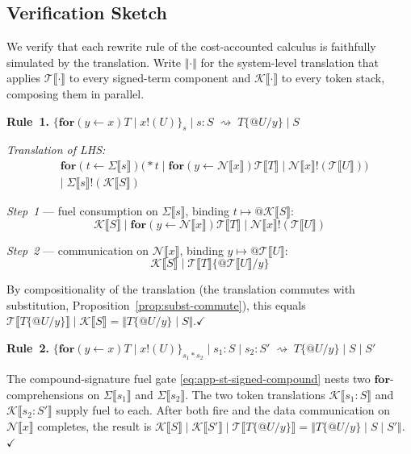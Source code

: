 \documentclass[11pt,a4paper]{article}
\makeatletter
\newcommand{\lsem}{\llbracket}
\newcommand{\rsem}{\rrbracket}
\newcommand{\Par}{\mathbin{|}}
\newcommand{\forc}{\mathbf{for}}
\newcommand{\send}[2]{#1 !\!\left( #2 \right)}
\newcommand{\recv}[3]{\forc\!\left( #1 \leftarrow #2 \right) #3}
\newcommand{\drop}[1]{{\ast} #1}
\newcommand{\quot}[1]{@#1}
\newcommand{\subst}[3]{#1\{#2 / #3\}}
\newcommand{\signed}[2]{\{#1\}_{#2}}
\newcommand{\comp}{\mathbin{*}}
\newcommand{\red}{\rightsquigarrow}
\makeatother
\begin{document}
\subsection{Verification Sketch}
\label{app:verification}

We verify that each rewrite rule of the cost-accounted
calculus is faithfully simulated by the translation.  Write
$\Vert\cdot\Vert$ for the system-level translation that
applies $\mathcal{T}\lsem\cdot\rsem$ to every signed-term
component and $\mathcal{K}\lsem\cdot\rsem$ to every token
stack, composing them in parallel.

\bigskip
\noindent
\textbf{Rule~1.}\;
$\signed{\recv{y}{x}{T} \Par \send{x}{U}}{s} \Par s : S
\;\red\; \subst{T}{\quot{U}}{y} \Par S$

\medskip\noindent
\textit{Translation of LHS:}
\begin{align*}
  &\recv{t}{\Sigma\lsem s \rsem}{
    \bigl(
      \drop{t}
      \Par \recv{y}{\mathcal{N}\lsem x \rsem}{
        \mathcal{T}\lsem T \rsem
      }
      \Par \send{\mathcal{N}\lsem x \rsem}{
        \mathcal{T}\lsem U \rsem
      }
    \bigr)
  }
  \\
  &\Par\;
  \send{\Sigma\lsem s \rsem}{\mathcal{K}\lsem S \rsem}
\end{align*}

\noindent
\textit{Step~1} --- fuel consumption on
$\Sigma\lsem s \rsem$, binding
$t \mapsto \quot{\mathcal{K}\lsem S \rsem}$:
\[
  \mathcal{K}\lsem S \rsem
  \Par
  \recv{y}{\mathcal{N}\lsem x \rsem}{
    \mathcal{T}\lsem T \rsem
  }
  \Par
  \send{\mathcal{N}\lsem x \rsem}{
    \mathcal{T}\lsem U \rsem
  }
\]

\noindent
\textit{Step~2} --- communication on
$\mathcal{N}\lsem x \rsem$, binding
$y \mapsto \quot{\mathcal{T}\lsem U \rsem}$:
\[
  \mathcal{K}\lsem S \rsem
  \Par
  \mathcal{T}\lsem T \rsem
    \bigl\{\quot{\mathcal{T}\lsem U \rsem}\big/y\bigr\}
\]

\noindent
By compositionality of the translation (the translation
commutes with substitution, Proposition~\ref{prop:subst-commute}),
this equals
$\mathcal{T}\lsem \subst{T}{\quot{U}}{y} \rsem \Par
\mathcal{K}\lsem S \rsem = \Vert \subst{T}{\quot{U}}{y} \Par S
\Vert$.\quad$\checkmark$

\bigskip
\noindent
\textbf{Rule~2.}\;
$\signed{\recv{y}{x}{T} \Par \send{x}{U}}{s_1 \comp s_2}
\Par s_1 : S \Par s_2 : S'
\;\red\; \subst{T}{\quot{U}}{y} \Par S \Par S'$

\medskip\noindent
The compound-signature fuel gate
\eqref{eq:app-st-signed-compound} nests two
$\mathbf{for}$-comprehensions on $\Sigma\lsem s_1 \rsem$ and
$\Sigma\lsem s_2 \rsem$.  The two token translations
$\mathcal{K}\lsem s_1 : S \rsem$ and
$\mathcal{K}\lsem s_2 : S' \rsem$ supply fuel to each.
After both fire and the data communication on
$\mathcal{N}\lsem x \rsem$ completes, the result is
$\mathcal{K}\lsem S \rsem \Par \mathcal{K}\lsem S' \rsem \Par
\mathcal{T}\lsem \subst{T}{\quot{U}}{y} \rsem
= \Vert \subst{T}{\quot{U}}{y} \Par S \Par S' \Vert$.
\quad$\checkmark$
\end{document}
